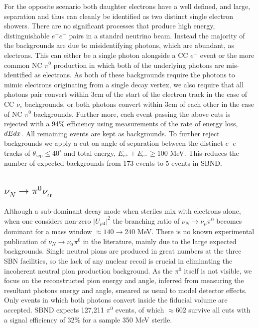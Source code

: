\documentclass[11pt, a4paper]{article}
\begin{document}
For the opposite scenario both daughter electrons have a well defined, and large, separation and thus can cleanly be identified as two distinct single electron showers. There are no significant processes that produce high energy, distinguishable $e^+e^-$ pairs in a standrd neutrino beam.  Instead the majority of the backgrounds are due to misidentifying photons, which are abundant, as electrons. This can either be a single photon alongside a CC $e^-$ event or the more common NC $\pi^0$ production in which both of the underlying photons are mis-identified as electrons. As both of these backgrounds require the photons to mimic electrons originating from a single decay vertex, we also require that all photons pair convert within 3cm of the start of the electron track in the case of CC $\nu_e$ backgrounds, or both photons convert within 3cm of each other in the case of NC $\pi^0$ backgrounds. Further more, each event passing the above cuts is rejected with a 94\% efficiency using measurements of the rate of energy loss, $dE\/dx$. All remaining events are kept as backgrounds. To further reject backgrounds we apply a cut on angle of separation between the distinct $e^-e^-$ tracks of $\theta_\text{sep}\leq 40 ^\circ$ and total energy, $E_{e^+}+E_{e^-} \geq 100$ MeV. This reduces the number of expected backgrounds from 173 events to 5 events in SBND. 


\subsection{$\nu_N \rightarrow \pi^0 \nu_\alpha$}
Although a sub-dominant decay mode when steriles mix with electrons alone, when one considers non-zero $\vert U_{\mu4}\vert^2$ the branching ratio of $\nu_N \rightarrow \nu_\mu \pi^0$ becomes dominant for a mass window $\approx 140 \rightarrow 240$ MeV. There is no known experimental publication of $\nu_N \rightarrow \nu_\alpha \pi^0$ in the literature, mainly due to the large expected backgrounds. Single neutral pions are produced in great numbers at the three SBN facilities, so the lack of any nuclear recoil is crucial in eliminating the incoherent neutral pion production background. As the $\pi^0$ itself is not visible, we focus on the reconstructed pion energy and angle, inferred from measuring the resultant photons energy and angle, smeared as usual to model detector effects. Only events in which both photons convert inside the fiducial volume are accepted. SBND expects 127,211 $\pi^0$ events, of which $\approx 602$ survive all cuts with a signal efficiency of 32\% for a sample 350 MeV sterile. \\ 
\end{document}
